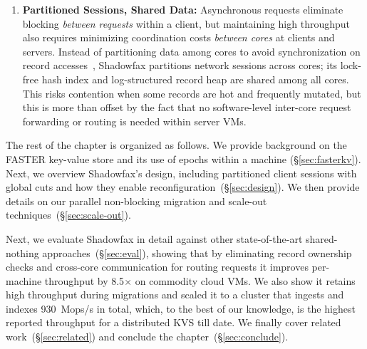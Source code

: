 \begin{enumerate}
\item {\bf Partitioned Sessions, Shared Data:}
Asynchronous requests eliminate blocking {\em between requests} within a client, but
maintaining high throughput also requires minimizing coordination
costs {\em between cores} at clients and servers.
%
Instead of partitioning data among cores to avoid synchronization on record
accesses~\cite{hstore,voltdb,mica,seastar}, Shadowfax partitions network
sessions across cores; its lock-free hash index and log-structured record heap
are shared among all cores.
%
This risks contention when some records are hot and frequently
mutated, but this is more than offset by the fact that no software-level
inter-core request forwarding or routing is needed within server VMs.

\end{enumerate}

The rest of the chapter is organized as follows. We provide background on the FASTER
key-value store and its use of epochs within a machine (\S\ref{sec:fasterkv}). Next,
we overview Shadowfax's design, including partitioned client
sessions with global cuts and how they enable
reconfiguration~(\S\ref{sec:design}). We then provide details on our parallel
non-blocking migration and scale-out techniques~(\S\ref{sec:scale-out}).
%
\iffalse
In the remainder of this paper, we describe how the key synchronization
mechanisms at the core of \faster{}'s design (\S\ref{sec:epochs}) naturally led
to Shadowfax's sessions that extend global cuts over the network
(\S\ref{sec:sessions}). We describe how this enables Shadowfax to perform the
same over the network as with a local \faster{}
instance~(\S\ref{sec:eval:clients}), and we describe how they enable
reconfiguration~(\S\ref{sec:ownership}) and parallel data
migration~(\S\ref{sec:scale-out}). We also describe how Shadowfax does this
while supporting larger-than-memory datasets that span SSD and cloud blob
storage.
\fi
%
Next, we evaluate Shadowfax in detail against other state-of-the-art shared-nothing
approaches~(\S\ref{sec:eval}), showing that by eliminating record ownership
checks and cross-core communication for routing requests it improves
per-machine throughput by 8.5$\times$ on commodity cloud VMs.
%
We also show it retains high throughput during migrations and scaled it
to a
cluster that ingests and indexes 930~Mops/s in total,
%
which, to the best of our knowledge, is the highest
reported throughput for a distributed KVS till date. We finally cover
related work~(\S\ref{sec:related}) and conclude the chapter~(\S\ref{sec:conclude}).
